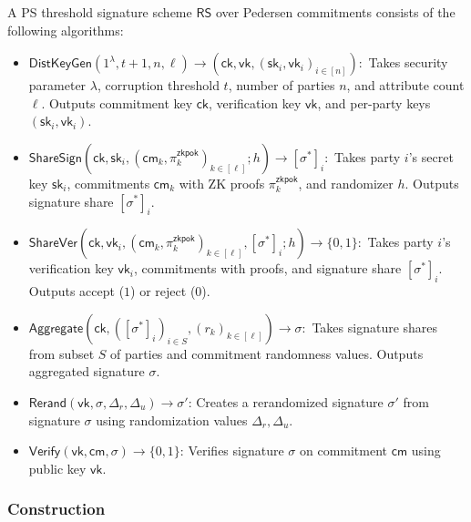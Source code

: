 \begin{definition}
A PS threshold signature scheme $\mathsf{RS}$ over Pedersen commitments consists of the following algorithms:
\begin{itemize}
    \item $\mathsf{DistKeyGen}(1^{\lambda}, t+1, n, \ell) \to (\mathsf{ck}, \mathsf{vk}, (\mathsf{sk}_i, \mathsf{vk}_i)_{i \in [n]}):$ Takes security parameter $\lambda$, corruption threshold $t$, number of parties $n$, and attribute count $\ell$. Outputs commitment key $\mathsf{ck}$, verification key $\mathsf{vk}$, and per-party keys $(\mathsf{sk}_i, \mathsf{vk}_i)$.
    
    \item $\mathsf{ShareSign}(\mathsf{ck}, \mathsf{sk}_i, (\mathsf{cm}_k, \pi_k^{\mathsf{zkpok}})_{k \in [\ell]}; h) \to [\sigma^*]_i:$ Takes party $i$'s secret key $\mathsf{sk}_i$, commitments $\mathsf{cm}_k$ with ZK proofs $\pi_k^{\mathsf{zkpok}}$, and randomizer $h$. Outputs signature share $[\sigma^*]_i$.
    
    \item $\mathsf{ShareVer}(\mathsf{ck}, \mathsf{vk}_i, (\mathsf{cm}_k, \pi_k^{\mathsf{zkpok}})_{k \in [\ell]}, [\sigma^*]_i; h) \to \{0,1\}:$ Takes party $i$'s verification key $\mathsf{vk}_i$, commitments with proofs, and signature share $[\sigma^*]_i$. Outputs accept ($1$) or reject ($0$).
    
    \item $\mathsf{Aggregate}(\mathsf{ck}, ([\sigma^*]_i)_{i \in S}, (r_k)_{k \in [\ell]}) \to \sigma:$ Takes signature shares from subset $S$ of parties and commitment randomness values. Outputs aggregated signature $\sigma$.

    \item $\mathsf{Rerand}(\mathsf{vk}, \sigma, \Delta_r, \Delta_u) \rightarrow \sigma'$: Creates a rerandomized signature $\sigma'$ from signature $\sigma$ using randomization values $\Delta_r, \Delta_u$.
    
    \item $\mathsf{Verify}(\mathsf{vk}, \mathsf{cm}, \sigma) \rightarrow \{0,1\}$: Verifies signature $\sigma$ on commitment $\mathsf{cm}$ using public key $\mathsf{vk}$.
    
\end{itemize}
\end{definition}





\subsubsection{Construction}\label{threshold-ps-construction}


